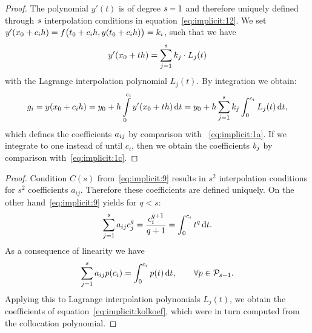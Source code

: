 \begin{proof}
  The polynomial $y'(t)$ is of degree $s-1$ and therefore uniquely
  defined through $s$ interpolation conditions in
  equation~\eqref{eq:implicit:12}.  We set $y'(x_0 + c_i h) =
  f\bigl(t_0+c_i h, y(t_0+c_i h)\bigr) = k_i$, such that we have
  \begin{gather}
    y'(x_0+t h) = \sum\limits_{j=1}^s k_j \cdot L_j(t)
  \end{gather}
  with the Lagrange interpolation polynomial $L_j(t)$.
  By integration we obtain:
  \begin{gather}
    g_i = y(x_0 + c_i h)
    = y_0 + h \int\limits_0^{c_i} y'(x_0 + t h) \,\mathrm{d} t
    = y_0+h \sum_{j=1}^s k_j \int_0^{c_i} L_j(t)\,\mathrm{d} t,
  \end{gather}
  which defines the coefficients $a_{ij}$ by comparison with
  ~\eqref{eq:implicit:1a}.  If we integrate to one instead of until
  $c_i$, then we obtain the coefficients $b_j$ by comparison
  with~\eqref{eq:implicit:1c}.
\end{proof}




\begin{proof}
  Condition $C(s)$ from~\eqref{eq:implicit:9} results in
  $s^2$ interpolation conditions for $s^2$ coefficients $a_{ij}$.
  Therefore these coefficients are defined uniquely. On the other
  hand~\eqref{eq:implicit:9} yields for $q<s$:
  \begin{gather*}
    \sum_{j=1}^s a_{ij} c_j^q = \frac{c_i^{q+1}}{q+1} =
    \int_{0}^{c_i} t^q \,\mathrm{d} t.
  \end{gather*}
  As a consequence of linearity we have
  \begin{gather*}
    \sum_{j=1}^s a_{ij} p(c_i) = \int_{0}^{c_i} p(t)
    \,\mathrm{d} t,\qquad\forall p\in \mathcal P_{s-1}.
  \end{gather*}
  Applying this to Lagrange interpolation polynomials $L_j(t)$, we
  obtain the coefficients of equation~\eqref{eq:implicit:kolkoef},
  which were in turn computed from the collocation polynomial.
\end{proof}



